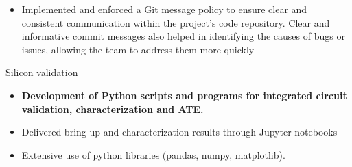 \begin{cventries}
{\begin{cvitems}
\begin{itemize}
\begin{itemize}
            \item {Implemented and enforced a Git message policy to ensure clear and consistent communication within the project's code repository. Clear and informative commit messages also helped in identifying the causes of bugs or issues, allowing the team to address them more quickly}
          \end{itemize}
        \end{itemize}
        \item {Silicon validation}
          \begin{itemize}
            \item {\textbf{Development of Python scripts and programs for integrated circuit validation, characterization and ATE.}}
            \item {Delivered bring-up and characterization results through Jupyter notebooks}
            \item {Extensive use of python libraries (pandas, numpy, matplotlib).}
          \end{itemize}

\end{cvitems}}
\end{cventries}
